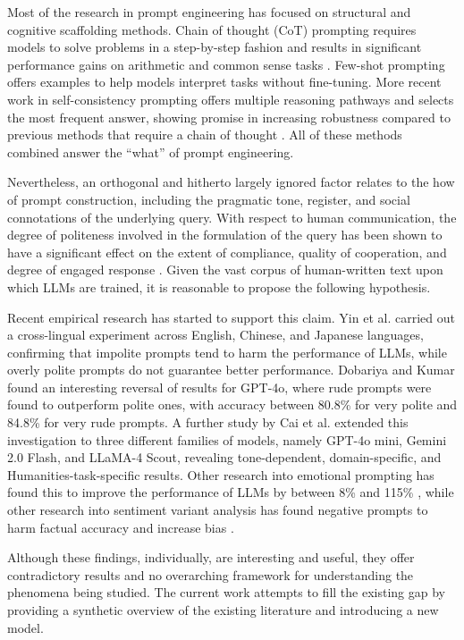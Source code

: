 \documentclass[conference]{IEEEtran}
\begin{document}
Most of the research in prompt engineering has focused on structural and cognitive scaffolding methods. Chain of thought (CoT) prompting requires models to solve problems in a step-by-step fashion and results in significant performance gains on arithmetic and common sense tasks \cite{b3}. Few-shot prompting offers examples to help models interpret tasks without fine-tuning. More recent work in self-consistency prompting offers multiple reasoning pathways and selects the most frequent answer, showing promise in increasing robustness compared to previous methods that require a chain of thought \cite{b4}. All of these methods combined answer the ``what'' of prompt engineering.

Nevertheless, an orthogonal and hitherto largely ignored factor relates to the how of prompt construction, including the pragmatic tone, register, and social connotations of the underlying query. With respect to human communication, the degree of politeness involved in the formulation of the query has been shown to have a significant effect on the extent of compliance, quality of cooperation, and degree of engaged response \cite{b5}. Given the vast corpus of human-written text upon which LLMs are trained, it is reasonable to propose the following hypothesis.

Recent empirical research has started to support this claim. Yin et al. \cite{b6} carried out a cross-lingual experiment across English, Chinese, and Japanese languages, confirming that impolite prompts tend to harm the performance of LLMs, while overly polite prompts do not guarantee better performance. Dobariya and Kumar \cite{b7} found an interesting reversal of results for GPT-4o, where rude prompts were found to outperform polite ones, with accuracy between 80.8\% for very polite and 84.8\% for very rude prompts. A further study by Cai et al. \cite{b8} extended this investigation to three different families of models, namely GPT-4o mini, Gemini 2.0 Flash, and LLaMA-4 Scout, revealing tone-dependent, domain-specific, and Humanities-task-specific results. Other research into emotional prompting has found this to improve the performance of LLMs by between 8\% and 115\% \cite{b9}, while other research into sentiment variant analysis has found negative prompts to harm factual accuracy and increase bias \cite{b10}.

Although these findings, individually, are interesting and useful, they offer contradictory results and no overarching framework for understanding the phenomena being studied. The current work attempts to fill the existing gap by providing a synthetic overview of the existing literature and introducing a new model.
\end{document}
